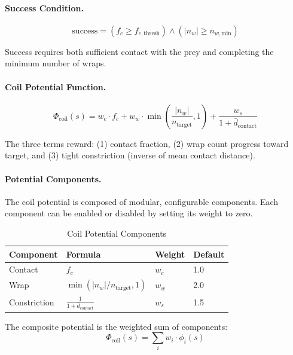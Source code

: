 \documentclass[11pt]{article}
\begin{document}
\paragraph{Success Condition.}
\begin{equation}
    \text{success} = (f_c \geq f_{c,\text{thresh}}) \land (|n_w| \geq n_{w,\text{min}})
\end{equation}

Success requires both sufficient contact with the prey and completing the minimum number of wraps.

\paragraph{Coil Potential Function.}
\begin{equation}
    \Phi_{\text{coil}}(s) = w_c \cdot f_c + w_w \cdot \min\left(\frac{|n_w|}{n_{\text{target}}}, 1\right) + \frac{w_s}{1 + \bar{d}_{\text{contact}}}
\end{equation}

The three terms reward: (1) contact fraction, (2) wrap count progress toward target, and (3) tight constriction (inverse of mean contact distance).

\paragraph{Potential Components.}
The coil potential is composed of modular, configurable components. Each component can be enabled or disabled by setting its weight to zero.

\begin{table}[H]
\centering
\caption{Coil Potential Components}
\begin{tabular}{@{}llll@{}}
\toprule
\textbf{Component} & \textbf{Formula} & \textbf{Weight} & \textbf{Default} \\
\midrule
Contact & $f_c$ & $w_c$ & 1.0 \\
Wrap & $\min(|n_w|/n_{\text{target}}, 1)$ & $w_w$ & 2.0 \\
Constriction & $\frac{1}{1 + \bar{d}_{\text{contact}}}$ & $w_s$ & 1.5 \\
\bottomrule
\end{tabular}
\end{table}

The composite potential is the weighted sum of components:
\begin{equation}
    \Phi_{\text{coil}}(s) = \sum_{i} w_i \cdot \phi_i(s)
\end{equation}
\end{document}
